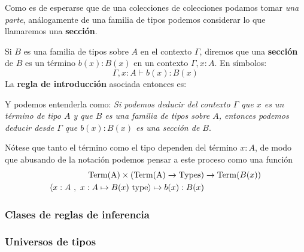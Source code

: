 \documentclass{article}
\begin{document}
        Como es de esperarse que de una colecciones de colecciones podamos tomar \textit{una parte}, análogamente de una familia de tipos
        podemos considerar lo que llamaremos una \textbf{sección}.

        \begin{definition}
            Si $B$ es una familia de tipos sobre $A$ en el contexto $\Gamma$, diremos que una \textbf{sección} de $B$ es un término $b(x) : B(x)$ en un contexto
            $\Gamma, x : A$. En símbolos:
            $$
                \Gamma, x : A \vdash b(x) : B(x)
            $$
            La \textbf{regla de introducción} asociada entonces es:

            \begin{prooftree}
            \end{prooftree}
            Y podemos entenderla como:
            \textit{Si podemos deducir del contexto $\Gamma$ que $x$ es un término de tipo $A$ y que $B$ es una familia de tipos sobre $A$, 
            entonces podemos deducir desde $\Gamma$ que $b(x) : B(x)$ es una sección de $B$}.
        \end{definition}

        \begin{remark}
            Nótese que tanto el término como el tipo dependen del término $x : A$, de modo que abusando de la notación podemos pensar a este proceso como
            una función
            \begin{align*}
                \mathrm{Term(A)} \times (\mathrm{Term(A)} \rightarrow \mathrm{Types}) &\rightarrow \mathrm{Term}(B(x))\\
                \picopar{x : A\ ,\ x : A \mapsto B(x)\ \type}\mapsto b(x) : B(x)
            \end{align*}
        \end{remark}
        
    \subsubsection{Clases de reglas de inferencia}
        
    \subsubsection{Universos de tipos}
        
\end{document}
